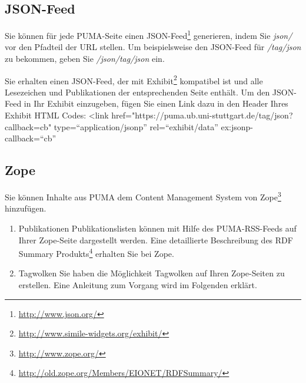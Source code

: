 \subsection{JSON-Feed}
\label{subsec:jsonFeed}
Sie können für jede PUMA-Seite einen JSON-Feed\footnote{\url{http://www.json.org/}} generieren, indem Sie \textit{json/} vor den Pfadteil der URL stellen. Um beispielsweise den JSON-Feed für \textit{/tag/json} zu bekommen, geben Sie \textit{/json/tag/json} ein.

Sie erhalten einen JSON-Feed, der mit Exhibit\footnote{\url{http://www.simile-widgets.org/exhibit/}} kompatibel ist und alle Lesezeichen und Publikationen der entsprechenden Seite enthält. Um den JSON-Feed in Ihr Exhibit einzugeben, fügen Sie einen Link dazu in den Header Ihres Exhibit HTML Codes:\newline
\newline
<link href="https://puma.ub.uni-stuttgart.de/tag/json?callback=cb" type=\enquote{application/jsonp} rel=\enquote{exhibit/data} ex:jsonp-callback=\enquote{cb}%
\newline

\subsection{Zope}
\label{subsec:zope}
Sie können Inhalte aus PUMA dem Content Management System von Zope\footnote{\url{http://www.zope.org/}} hinzufügen.
\begin{enumerate}
    \item Publikationen\newline
    Publikationslisten können mit Hilfe des PUMA-RSS-Feeds auf Ihrer Zope-Seite dargestellt werden. Eine detaillierte Beschreibung des RDF Summary Produkts\footnote{\url{http://old.zope.org/Members/EIONET/RDFSummary/}} erhalten Sie bei Zope.
    \item Tagwolken\newline
    Sie haben die Möglichkeit Tagwolken auf Ihren Zope-Seiten zu  erstellen. Eine Anleitung zum Vorgang wird im Folgenden erklärt.
\end{enumerate}
